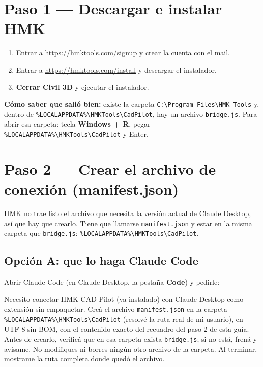 \documentclass[12pt, a4paper]{article}
\newcommand{\nota}[1]{%
  \par\noindent\colorbox{fondoNota}{\parbox{\dimexpr\linewidth-2\fboxsep\relax}{#1}}\par}
\begin{document}
\section*{Paso 1 --- Descargar e instalar HMK}

\begin{enumerate}[itemsep=2pt]
  \item Entrar a \url{https://hmktools.com/signup} y crear la cuenta con el mail.
  \item Entrar a \url{https://hmktools.com/install} y descargar el instalador.
  \item \textbf{Cerrar Civil 3D} y ejecutar el instalador.
\end{enumerate}

\textbf{Cómo saber que salió bien:} existe la carpeta \texttt{C:\textbackslash Program
Files\textbackslash HMK Tools} y, dentro de
\texttt{\%LOCALAPPDATA\%\textbackslash HMKTools\textbackslash CadPilot}, hay un archivo
\texttt{bridge.js}. Para abrir esa carpeta: tecla \textbf{Windows + R}, pegar
\texttt{\%LOCALAPPDATA\%\textbackslash HMKTools\textbackslash CadPilot} y Enter.

\section*{Paso 2 --- Crear el archivo de conexión (manifest.json)}

HMK no trae listo el archivo que necesita la versión actual de Claude Desktop, así que hay que
crearlo. Tiene que llamarse \texttt{manifest.json} y estar en la misma carpeta que
\texttt{bridge.js}:
\texttt{\%LOCALAPPDATA\%\textbackslash HMKTools\textbackslash CadPilot}.

\subsection*{Opción A: que lo haga Claude Code}

Abrir Claude Code (en Claude Desktop, la pestaña \textbf{Code}) y pedirle:

\nota{Necesito conectar HMK CAD Pilot (ya instalado) con Claude Desktop como extensión sin
empaquetar. Creá el archivo \texttt{manifest.json} en la carpeta
\texttt{\%LOCALAPPDATA\%\textbackslash HMKTools\textbackslash CadPilot} (resolvé la ruta real de
mi usuario), en UTF-8 sin BOM, con el contenido exacto del recuadro del paso 2 de esta guía.
Antes de crearlo, verificá que en esa carpeta exista \texttt{bridge.js}; si no está, frená y
avisame. No modifiques ni borres ningún otro archivo de la carpeta. Al terminar, mostrame la
ruta completa donde quedó el archivo.}
\end{document}
